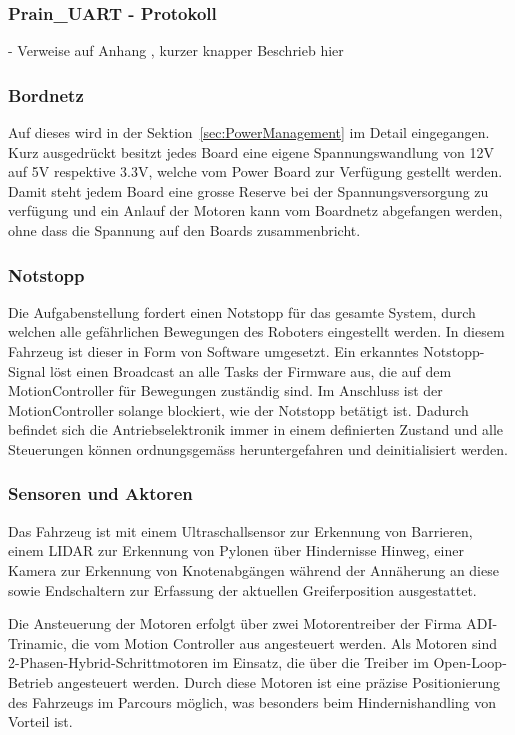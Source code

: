 \documentclass[main.tex]{subfiles} %
\begin{document}
\subsubsection{Prain\_UART - Protokoll}
- Verweise auf Anhang , kurzer knapper Beschrieb hier

\subsubsection*{Bordnetz}

Auf dieses wird in der Sektion~\ref{sec:PowerManagement} im Detail eingegangen.
Kurz ausgedrückt besitzt jedes Board eine eigene Spannungswandlung von 12V auf
5V respektive 3.3V, welche vom Power Board zur Verfügung gestellt werden. Damit
steht jedem Board eine grosse Reserve bei der Spannungsversorgung zu verfügung
und ein Anlauf der Motoren kann vom Boardnetz abgefangen werden, ohne dass die
Spannung auf den Boards zusammenbricht.

\subsubsection*{Notstopp}

Die Aufgabenstellung fordert einen Notstopp für das gesamte System, durch
welchen alle gefährlichen Bewegungen des Roboters eingestellt werden. In diesem
Fahrzeug ist dieser in Form von Software umgesetzt. Ein erkanntes
Notstopp-Signal löst einen Broadcast an alle Tasks der Firmware aus, die auf
dem MotionController für Bewegungen zuständig sind. Im Anschluss ist der
MotionController solange blockiert, wie der Notstopp betätigt ist. Dadurch
befindet sich die Antriebselektronik immer in einem definierten Zustand und
alle Steuerungen können ordnungsgemäss heruntergefahren und deinitialisiert
werden.

\subsubsection*{Sensoren und Aktoren}

Das Fahrzeug ist mit einem Ultraschallsensor zur Erkennung von Barrieren, einem
LIDAR zur Erkennung von Pylonen über Hindernisse Hinweg, einer Kamera zur
Erkennung von Knotenabgängen während der Annäherung an diese sowie Endschaltern
zur Erfassung der aktuellen Greiferposition ausgestattet.

Die Ansteuerung der Motoren erfolgt über zwei Motorentreiber der Firma
ADI-Trinamic, die vom Motion Controller aus angesteuert werden. Als Motoren
sind 2-Phasen-Hybrid-Schrittmotoren im Einsatz, die über die Treiber im
Open-Loop-Betrieb angesteuert werden. Durch diese Motoren ist eine präzise
Positionierung des Fahrzeugs im Parcours möglich, was besonders beim
Hindernishandling von Vorteil ist.
\end{document}
